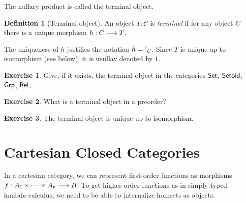 \documentclass[a4paper,fleqn]{scrartcl}
\theoremstyle{definition}
\newtheorem{definition}{Definition}
\newtheorem{exercise}{Exercise}
\newcommand{\C}{\mathcal{C}}
\begin{document}
The nullary product is called the terminal object.
\begin{definition}[Terminal object]
  An object $T : \C$ is \emph{terminal} if for any object $C$ there is
  a unique morphism $h : C \too T$.

  The uniqueness of $h$ justifies the notation $h = \bang[C]$.
  Since $T$ is unique up to isomorphism (see below), it is usullay
  denoted by $1$.
\end{definition}
\begin{exercise}
  Give, if it exists, the terminal object in the categories $\Set$,
  $\Setoid$, $\Grp$, $\Rel$.
\end{exercise}
\begin{exercise}
  What is a terminal object in a preorder?
\end{exercise}
\begin{exercise}
  The terminal object is unique up to isomorphism.
\end{exercise}

\section{Cartesian Closed Categories}

In a cartesian category, we can represent first-order functions as
morphisms $f : A_1 \times \dots \times A_n \too B$.  To get
higher-order functions as in simply-typed lambda-calculus, we need to
be able to internalize homsets as objects.
\end{document}

